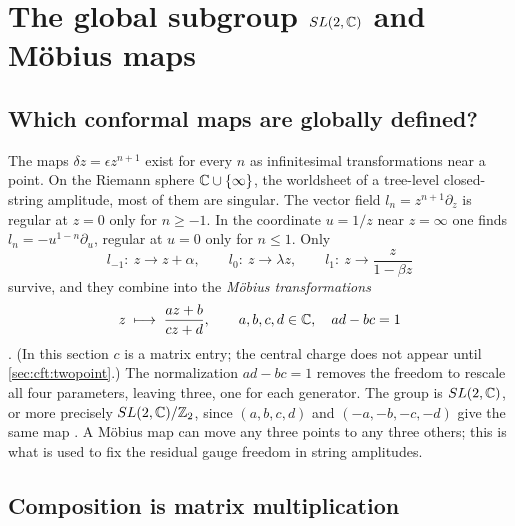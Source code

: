 \section{The global subgroup \texorpdfstring{$SL(2,\mathbb{C})$}{SL(2,C)} and M\"obius maps}
\label{sec:cft:sl2}

\subsection{Which conformal maps are globally defined?}

The maps $\delta z=\epsilon z^{n+1}$ exist for every $n$ as infinitesimal transformations near a
point. On the Riemann sphere $\mathbb{C}\cup\{\infty\}$, the worldsheet of a tree-level closed-string
amplitude, most of them are singular. The vector field $l_n=z^{n+1}\partial_z$ is regular at
$z=0$ only for $n\ge-1$. In the coordinate $u=1/z$ near $z=\infty$ one finds
$l_n=-u^{1-n}\partial_u$, regular at $u=0$ only for $n\le1$. Only
\begin{equation*}
  l_{-1}:\ z\to z+\alpha,\qquad l_0:\ z\to\lambda z,\qquad l_1:\ z\to\frac{z}{1-\beta z}
\end{equation*}
survive, and they combine into the \emph{M\"obius transformations}
\begin{equation}\label{eq:cft:mobius}
  z\;\longmapsto\;\frac{az+b}{cz+d},\qquad a,b,c,d\in\mathbb{C},\quad ad-bc=1
\end{equation}
. (In this section $c$ is a matrix entry; the central
charge does not appear until \cref{sec:cft:twopoint}.) The normalization $ad-bc=1$ removes the
freedom to rescale all four parameters, leaving three, one for each generator. The group is $SL(2,\mathbb{C})$, or more precisely $SL(2,\mathbb{C})/\mathbb{Z}_2$, since
$(a,b,c,d)$ and $(-a,-b,-c,-d)$ give the same map . A
M\"obius map can move any three points to any three others; this is what is used to fix the
residual gauge freedom in string amplitudes.

\subsection{Composition is matrix multiplication}

